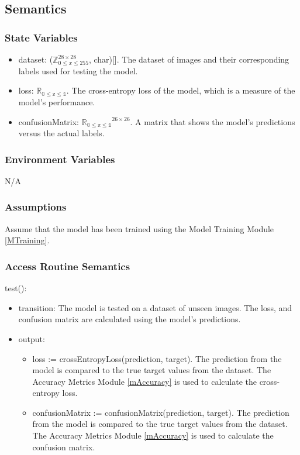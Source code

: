 \documentclass[12pt, titlepage]{article}
\begin{document}
\subsection{Semantics}

\subsubsection{State Variables}

\begin{itemize}
  \item dataset: ($\mathbb{Z}^{28 \times 28}_{0 \le x \le 255}$, char)[]. The
  dataset of images and their corresponding labels used for testing the model.
  \item loss: $\mathbb{R_{\text{0} \leq \text{x} \leq \text{1}}}$. The
  cross-entropy loss of the model, which is a measure of the model's performance.
  \item confusionMatrix: $\mathbb{R_{\text{0} \leq \text{x} \leq \text{1}}}^{26 \times 26}$. A matrix that shows the model's predictions versus the actual labels.
\end{itemize}

\subsubsection{Environment Variables}

N/A

\subsubsection{Assumptions}

Assume that the model has been trained using the Model Training Module
\ref{MTraining}.

\subsubsection{Access Routine Semantics}

\noindent test():
\begin{itemize}
\item transition: The model is tested on a dataset of unseen images. The loss,
and confusion matrix are calculated using the model's predictions.
\item output:
\begin{itemize}
  \item loss := crossEntropyLoss(prediction, target). The prediction from the
  model is compared to the true target values from the dataset. The Accuracy
  Metrics Module \ref{mAccuracy} is used to calculate the cross-entropy loss.
  \item confusionMatrix := confusionMatrix(prediction, target). The prediction
  from the model is compared to the true target values from the dataset. The
  Accuracy Metrics Module \ref{mAccuracy} is used to calculate the confusion
  matrix.
\end{itemize}
\end{itemize}
\end{document}
